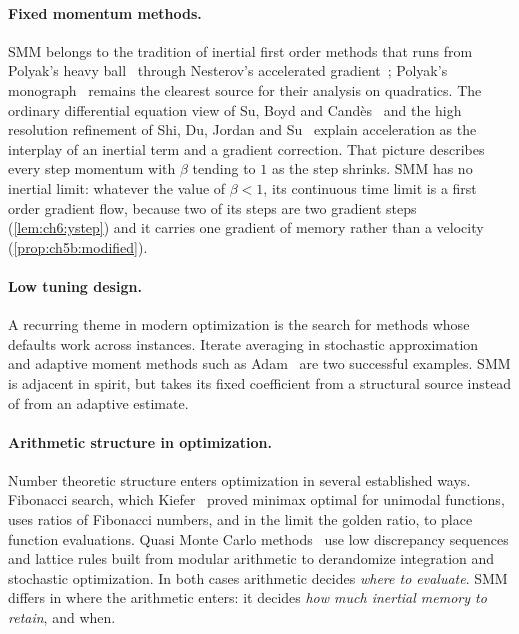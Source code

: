 \paragraph{Fixed momentum methods.} SMM belongs to the tradition of inertial
first order methods that runs from Polyak's heavy ball~\cite{polyak1964} through
Nesterov's accelerated gradient~\cite{nesterov1983}; Polyak's
monograph~\cite{polyak1987} remains the clearest source for their analysis on
quadratics. The ordinary differential equation view of
Su, Boyd and Cand\`es~\cite{su2016} and the high resolution refinement of
Shi, Du, Jordan and Su~\cite{shi2022} explain acceleration as the interplay of
an inertial term and a gradient correction.
That picture describes every step momentum with $\beta$ tending to $1$ as the step shrinks. SMM has no inertial limit: whatever the value of $\beta<1$, its continuous time limit is a first order gradient flow, because two of its steps are two gradient steps (\cref{lem:ch6:ystep}) and it carries one gradient of memory rather than a velocity (\cref{prop:ch5b:modified}).

\paragraph{Low tuning design.} A recurring theme in modern optimization is the
search for methods whose defaults work across instances. Iterate averaging in
stochastic approximation~\cite{ruppert1988,polyak1990,polyak1992} and adaptive moment methods such as
Adam~\cite{kingma2015} are two successful examples. SMM is adjacent in spirit,
but takes its fixed coefficient from a structural source instead of from an
adaptive estimate.

\paragraph{Arithmetic structure in optimization.} Number theoretic structure
enters optimization in several established ways. Fibonacci search, which
Kiefer~\cite{kiefer1953} proved minimax optimal for unimodal functions, uses
ratios of Fibonacci numbers, and in the limit the golden ratio, to place
function evaluations. Quasi Monte Carlo methods~\cite{niederreiter1992} use
low discrepancy sequences and lattice rules built from modular arithmetic to
derandomize integration and stochastic optimization. In both cases arithmetic
decides \emph{where to evaluate}. SMM differs in where the arithmetic enters:
it decides \emph{how much inertial memory to retain}, and when.

